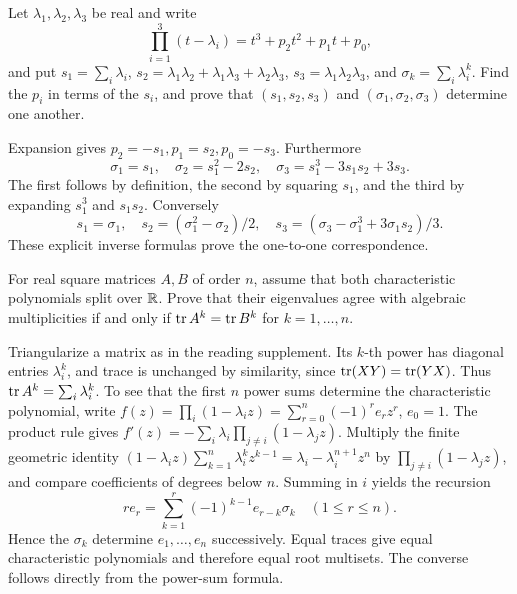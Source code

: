 \begin{problem}\label{ex:08:newton-three}
Let \(\lambda_1,\lambda_2,\lambda_3\) be real and write
\[
 \prod_{i=1}^3(t-\lambda_i)=t^3+p_2t^2+p_1t+p_0,
\]
and put \(s_1=\sum_i\lambda_i\),
\(s_2=\lambda_1\lambda_2+\lambda_1\lambda_3+\lambda_2\lambda_3\),
\(s_3=\lambda_1\lambda_2\lambda_3\), and
\(\sigma_k=\sum_i\lambda_i^k\).
Find the \(p_i\) in terms of the \(s_i\), and prove that
\((s_1,s_2,s_3)\) and \((\sigma_1,\sigma_2,\sigma_3)\) determine one another.
\end{problem}
\begin{solution}
Expansion gives \(p_2=-s_1,p_1=s_2,p_0=-s_3\).
Furthermore
\[
 \sigma_1=s_1,\quad \sigma_2=s_1^2-2s_2,\quad
 \sigma_3=s_1^3-3s_1s_2+3s_3.
\]
The first follows by definition, the second by squaring \(s_1\),
and the third by expanding \(s_1^3\) and \(s_1s_2\).
Conversely
\[
 s_1=\sigma_1,\quad s_2=(\sigma_1^2-\sigma_2)/2,\quad
 s_3=(\sigma_3-\sigma_1^3+3\sigma_1s_2)/3.
\]
These explicit inverse formulas prove the one-to-one correspondence.
\end{solution}

\begin{problem}\label{ex:08:newton-general}
For real square matrices \(A,B\) of order \(n\), assume that both
characteristic polynomials split over \(\mathbb R\). Prove that their eigenvalues
agree with algebraic multiplicities if and only if
\(\operatorname{tr} A^k=\operatorname{tr} B^k\) for \(k=1,\ldots,n\).
\end{problem}
\begin{solution}
Triangularize a matrix as in the reading supplement. Its \(k\)-th power
has diagonal entries \(\lambda_i^k\), and trace is unchanged by
similarity, since \(\operatorname{tr}(XY)=\operatorname{tr}(YX)\). Thus
\(\operatorname{tr} A^k=\sum_i\lambda_i^k\).
To see that the first \(n\) power sums determine the characteristic
polynomial, write
\(f(z)=\prod_i(1-\lambda_i z)=\sum_{r=0}^n(-1)^r e_rz^r\), \(e_0=1\).
The product rule gives
\(f'(z)=-\sum_i\lambda_i\prod_{j\ne i}(1-\lambda_jz)\).
Multiply the finite geometric identity
\((1-\lambda_i z)\sum_{k=1}^n\lambda_i^kz^{k-1}
=\lambda_i-\lambda_i^{n+1}z^n\)
by \(\prod_{j\ne i}(1-\lambda_jz)\), and compare coefficients of
degrees below \(n\). Summing in \(i\) yields the recursion
\[
 r e_r=\sum_{k=1}^r(-1)^{k-1}e_{r-k}\sigma_k
 \quad(1\leqslant r\leqslant n).
\]
Hence the \(\sigma_k\) determine \(e_1,\ldots,e_n\) successively.
Equal traces give equal characteristic polynomials and therefore equal
root multisets. The converse follows directly from the power-sum formula.
\end{solution}

